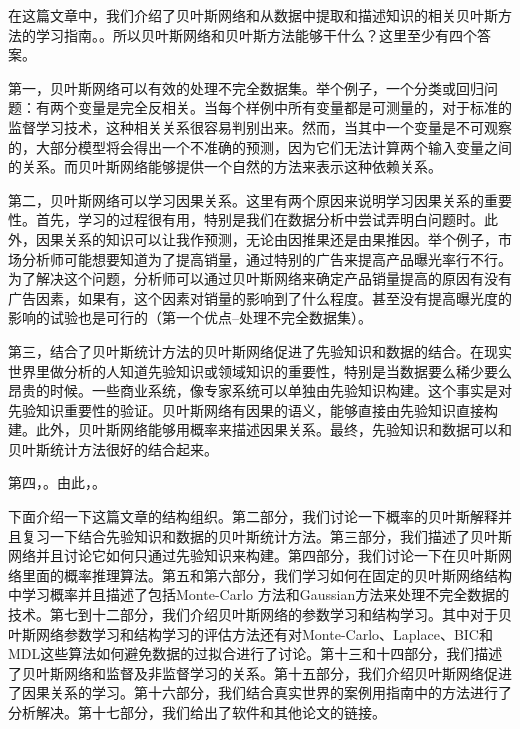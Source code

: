 \documentclass[10pt,a4paper]{article}
\begin{document}
\begin{CJK*}{UTF8}{gkai}
在这篇文章中，我们介绍了贝叶斯网络和从数据中提取和描述知识的相关贝叶斯方法的学习指南。。所以贝叶斯网络和贝叶斯方法能够干什么？这里至少有四个答案。


第一，贝叶斯网络可以有效的处理不完全数据集。举个例子，一个分类或回归问题：有两个变量是完全反相关。当每个样例中所有变量都是可测量的，对于标准的监督学习技术，这种相关关系很容易判别出来。然而，当其中一个变量是不可观察的，大部分模型将会得出一个不准确的预测，因为它们无法计算两个输入变量之间的关系。而贝叶斯网络能够提供一个自然的方法来表示这种依赖关系。


第二，贝叶斯网络可以学习因果关系。这里有两个原因来说明学习因果关系的重要性。首先，学习的过程很有用，特别是我们在数据分析中尝试弄明白问题时。此外，因果关系的知识可以让我作预测，无论由因推果还是由果推因。举个例子，市场分析师可能想要知道为了提高销量，通过特别的广告来提高产品曝光率行不行。为了解决这个问题，分析师可以通过贝叶斯网络来确定产品销量提高的原因有没有广告因素，如果有，这个因素对销量的影响到了什么程度。甚至没有提高曝光度的影响的试验也是可行的（第一个优点--处理不完全数据集）。


第三，结合了贝叶斯统计方法的贝叶斯网络促进了先验知识和数据的结合。在现实世界里做分析的人知道先验知识或领域知识的重要性，特别是当数据要么稀少要么昂贵的时候。一些商业系统，像专家系统可以单独由先验知识构建。这个事实是对先验知识重要性的验证。贝叶斯网络有因果的语义，能够直接由先验知识直接构建。此外，贝叶斯网络能够用概率来描述因果关系。最终，先验知识和数据可以和贝叶斯统计方法很好的结合起来。


第四，。由此，。


下面介绍一下这篇文章的结构组织。第二部分，我们讨论一下概率的贝叶斯解释并且复习一下结合先验知识和数据的贝叶斯统计方法。第三部分，我们描述了贝叶斯网络并且讨论它如何只通过先验知识来构建。第四部分，我们讨论一下在贝叶斯网络里面的概率推理算法。第五和第六部分，我们学习如何在固定的贝叶斯网络结构中学习概率并且描述了包括Monte-Carlo
方法和Gaussian方法来处理不完全数据的技术。第七到十二部分，我们介绍贝叶斯网络的参数学习和结构学习。其中对于贝叶斯网络参数学习和结构学习的评估方法还有对Monte-Carlo、Laplace、BIC和MDL这些算法如何避免数据的过拟合进行了讨论。第十三和十四部分，我们描述了贝叶斯网络和监督及非监督学习的关系。第十五部分，我们介绍贝叶斯网络促进了因果关系的学习。第十六部分，我们结合真实世界的案例用指南中的方法进行了分析解决。第十七部分，我们给出了软件和其他论文的链接。




\end{CJK*}
\end{document}
